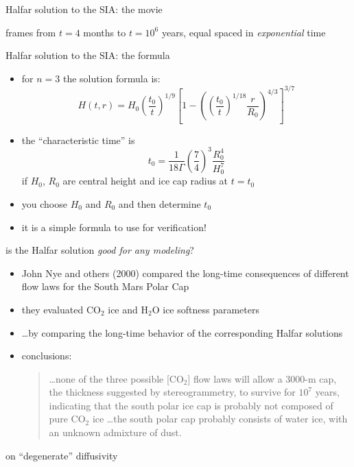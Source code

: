 \documentclass[titlepage,letterpaper,final,11pt]{scrartcl}
\begin{document}
Halfar solution to the SIA: the movie


frames from $t=4$ months to $t = 10^6$ years, equal spaced in \emph{exponential} time

Halfar solution to the SIA: the formula

\begin{itemize}
\item for $n=3$ the solution formula is:
  $$H(t,r) = H_0 \left(\frac{t_0}{t}\right)^{1/9} \left[1 - \left(\left(\frac{t_0}{t}\right)^{1/18} \frac{r}{R_0}\right)^{4/3}\right]^{3/7}$$
\item the ``characteristic time'' is
  $$t_0 = \frac{1}{18 \Gamma} \left(\frac{7}{4}\right)^3 \frac{R_0^4}{H_0^{7}}$$
if $H_0$, $R_0$ are central height and ice cap radius at $t=t_0$
\item you choose $H_0$ and $R_0$ and then determine $t_0$
\item it is a simple formula to use for verification!
\end{itemize}

is the Halfar solution \emph{good for any modeling}?

\begin{itemize}
\item John Nye and others (2000)\nocite{NyeIcarus2000} compared the long-time consequences of different flow laws for the South Mars Polar Cap
\item they evaluated $\text{CO}_2$ ice and $\text{H}_2\text{O}$ ice softness parameters
\item \dots by comparing the long-time behavior of the corresponding Halfar solutions
\item conclusions:
  \begin{quote}
  \dots none of the three possible [$\text{CO}_2$] flow laws will allow a 3000-m cap, the thickness suggested by stereogrammetry, to survive for $10^7$ years, indicating that the south polar ice cap is probably not composed of pure $\text{CO}_2$ ice \dots the south polar cap probably consists of water ice, with an unknown admixture of dust.
  \end{quote}
\end{itemize}

on ``degenerate'' diffusivity
\end{document}
